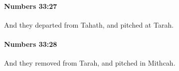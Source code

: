 		\paragraph{Numbers 33:27} %
			\label{NUMBERS-33-27}

			And they departed from Tahath, and pitched at Tarah.


		\paragraph{Numbers 33:28} %
			\label{NUMBERS-33-28}

			And they removed from Tarah, and pitched in Mithcah.


